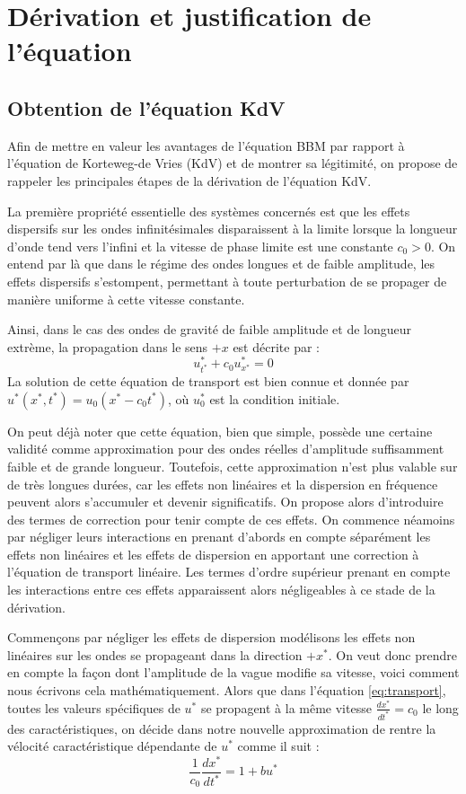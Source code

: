 
\chapter{Dérivation et justification de l'équation}
\section{Obtention de l'équation KdV}

Afin de mettre en valeur les avantages de l'équation BBM par rapport à l'équation de Korteweg-de Vries (KdV) et de montrer sa légitimité, on propose de rappeler les principales étapes de la dérivation de l'équation KdV.

La première propriété essentielle des systèmes concernés est que les effets dispersifs sur les ondes infinitésimales disparaissent à la limite lorsque la longueur d’onde tend vers l’infini et la vitesse de phase limite est une constante $c_0 > 0$. On entend par là que dans le régime
des ondes longues et de faible amplitude, les effets dispersifs s'estompent, permettant à
toute perturbation de se propager de manière uniforme à cette vitesse constante.

Ainsi, dans le cas des ondes de gravité de faible amplitude et de longueur extrème, la propagation dans le sens $+x$ est décrite par :
\begin{equation}\label{eq:transport}
    u^*_{t^*} + c_0 u^*_{x^*} = 0
\end{equation}
La solution de cette équation de transport est bien connue et donnée par $u^*(x^*,t^*) = u_0(x^* - c_0 t^*)$, où $u^*_0$ est la condition initiale.

On peut déjà noter que cette équation, bien que simple, possède une certaine validité comme approximation pour des ondes réelles d’amplitude suffisamment faible et de grande longueur. Toutefois, cette approximation n’est plus valable sur de très longues durées, car les effets non linéaires et la dispersion en fréquence peuvent alors s’accumuler et devenir significatifs.
On propose alors d'introduire des termes de correction pour tenir compte de ces effets. On commence néamoins par négliger leurs interactions en prenant d'abords en compte séparément les effets non linéaires et les effets de dispersion en apportant une correction à l'équation de transport linéaire. Les termes d'ordre supérieur prenant en compte les interactions entre ces effets apparaissent alors négligeables à ce stade de la dérivation.

Commençons par négliger les effets de dispersion modélisons les effets non linéaires sur les ondes se propageant dans la direction $+x^*$. On veut donc prendre en compte la façon dont l'amplitude de la vague modifie sa vitesse, voici comment nous écrivons cela mathématiquement. Alors que dans l'équation \ref{eq:transport}, toutes les valeurs spécifiques de $u^*$ se propagent à la même vitesse $\frac{dx^*}{dt^*} = c_0$ le long des caractéristiques, on décide dans notre nouvelle approximation de rentre la vélocité caractéristique dépendante de $u^*$ comme il suit :
\begin{equation}
    \frac{1}{c_0} \frac{dx^*}{dt^*} = 1 + b u^*
\end{equation}

